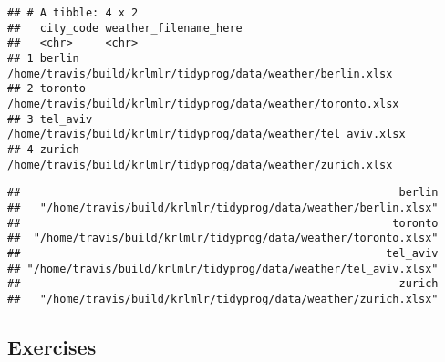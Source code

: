 \documentclass[]{book}
\newenvironment{Shaded}{\begin{snugshade}}{\end{snugshade}}
\newcommand{\DataTypeTok}[1]{\textcolor[rgb]{0.13,0.29,0.53}{#1}}
\newcommand{\KeywordTok}[1]{\textcolor[rgb]{0.13,0.29,0.53}{\textbf{#1}}}
\newcommand{\NormalTok}[1]{#1}
\newcommand{\OperatorTok}[1]{\textcolor[rgb]{0.81,0.36,0.00}{\textbf{#1}}}
\newcommand{\StringTok}[1]{\textcolor[rgb]{0.31,0.60,0.02}{#1}}
\begin{document}
\begin{Shaded}
\end{Shaded}

\begin{verbatim}
## # A tibble: 4 x 2
##   city_code weather_filename_here                                        
##   <chr>     <chr>                                                        
## 1 berlin    /home/travis/build/krlmlr/tidyprog/data/weather/berlin.xlsx  
## 2 toronto   /home/travis/build/krlmlr/tidyprog/data/weather/toronto.xlsx 
## 3 tel_aviv  /home/travis/build/krlmlr/tidyprog/data/weather/tel_aviv.xlsx
## 4 zurich    /home/travis/build/krlmlr/tidyprog/data/weather/zurich.xlsx
\end{verbatim}

\begin{Shaded}
\end{Shaded}

\begin{verbatim}
##                                                          berlin 
##   "/home/travis/build/krlmlr/tidyprog/data/weather/berlin.xlsx" 
##                                                         toronto 
##  "/home/travis/build/krlmlr/tidyprog/data/weather/toronto.xlsx" 
##                                                        tel_aviv 
## "/home/travis/build/krlmlr/tidyprog/data/weather/tel_aviv.xlsx" 
##                                                          zurich 
##   "/home/travis/build/krlmlr/tidyprog/data/weather/zurich.xlsx"
\end{verbatim}

\hypertarget{exercises-7}{%
\subsection{Exercises}\label{exercises-7}}
\end{document}
